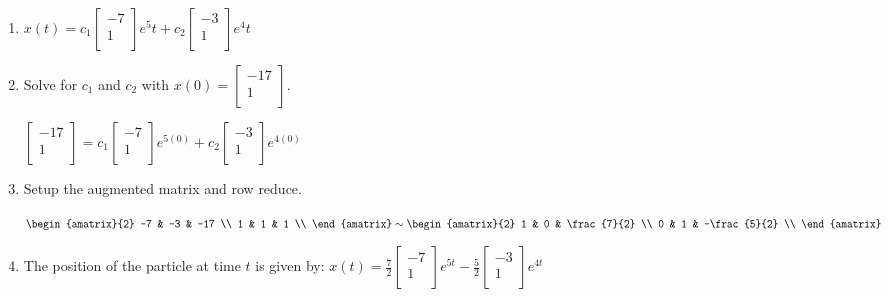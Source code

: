 \documentclass[12pt, letterpaper]{article}
\begin{document}
  \begin{enumerate}
    \item $ x(t) = c_1
      \begin{bmatrix}
        -7 \\
        1 \\
      \end{bmatrix} e^{5}t + c_2
      \begin{bmatrix}
        -3 \\
        1 \\
      \end{bmatrix} e^{4}t $
    \item Solve for $ c_1 $ and $ c_2 $ with $ x(0) =
      \begin{bmatrix}
        -17 \\
        1 \\
      \end{bmatrix} $.
      \medskip

      $
      \begin{bmatrix}
        -17 \\
        1 \\
      \end{bmatrix} = c_1
      \begin{bmatrix}
        -7 \\
        1 \\
      \end{bmatrix} e^{5(0)} + c_2
      \begin{bmatrix}
        -3 \\
        1 \\
      \end{bmatrix} e^{4(0)} $

    \item Setup the augmented matrix and row reduce.
      \medskip

      $ \displaystyle
      \begin{amatrix}{2}
        -7 & -3 & -17 \\
        1 & 1 & 1 \\
      \end{amatrix} \sim
      \begin{amatrix}{2}
        1 & 0 & \frac{7}{2} \\
        0 & 1 & -\frac{5}{2} \\
      \end{amatrix} $
    \item The position of the particle at time $ t $ is given by:
      $\displaystyle x(t) = \frac{7}{2}
      \begin{bmatrix}
        -7 \\
        1 \\
      \end{bmatrix} e^{5t} - \frac{5}{2}
      \begin{bmatrix}
        -3 \\
        1 \\
      \end{bmatrix} e^{4t} $
  \end{enumerate}
\end{document}
